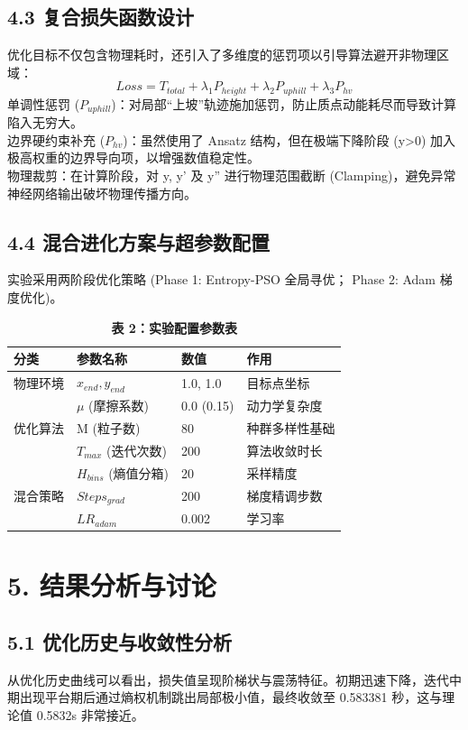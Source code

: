 \documentclass[twocolumn, 12pt]{article} %
\newcommand{\wuhao}{\fontsize{10.5pt}{12.6pt}\selectfont} %
\begin{document}
	\subsection{4.3 复合损失函数设计}
	优化目标不仅包含物理耗时，还引入了多维度的惩罚项以引导算法避开非物理区域：
	\begin{equation}
		Loss = T_{total} + \lambda_1 P_{height} + \lambda_2 P_{uphill} + \lambda_3 P_{hv}
	\end{equation}
	单调性惩罚 ($P_{uphill}$)：对局部“上坡”轨迹施加惩罚，防止质点动能耗尽而导致计算陷入无穷大。\\
	边界硬约束补充 ($P_{hv}$)：虽然使用了 Ansatz 结构，但在极端下降阶段 (y>0) 加入极高权重的边界导向项，以增强数值稳定性。\\
	物理裁剪：在计算阶段，对 y, y' 及 y'' 进行物理范围截断 (Clamping)，避免异常神经网络输出破坏物理传播方向。
	
	\subsection{4.4 混合进化方案与超参数配置}
	实验采用两阶段优化策略 (Phase 1: Entropy-PSO 全局寻优； Phase 2: Adam 梯度优化)。
	
	\begin{table}[ht]
		\centering
		\caption{\textbf{表 2：实验配置参数表}}
		\wuhao
		\begin{tabular}{llll}
			\toprule
			分类 & 参数名称 & 数值 & 作用 \\
			\midrule
			物理环境 & $x_{end}, y_{end}$ & 1.0, 1.0 & 目标点坐标 \\
			& $\mu$ (摩擦系数) & 0.0 (0.15) & 动力学复杂度 \\
			优化算法 & M (粒子数) & 80 & 种群多样性基础 \\
			& $T_{max}$ (迭代次数) & 200 & 算法收敛时长 \\
			& $H_{bins}$ (熵值分箱) & 20 & 采样精度 \\
			混合策略 & $Steps_{grad}$ & 200 & 梯度精调步数 \\
			& $LR_{adam}$ & 0.002 & 学习率 \\
			\bottomrule
		\end{tabular}
	\end{table}
	
	\section{5. 结果分析与讨论}
	\subsection{5.1 优化历史与收敛性分析}
	从优化历史曲线可以看出，损失值呈现阶梯状与震荡特征。初期迅速下降，迭代中期出现平台期后通过熵权机制跳出局部极小值，最终收敛至 0.583381 秒，这与理论值 0.5832s 非常接近。
	
\end{document}
